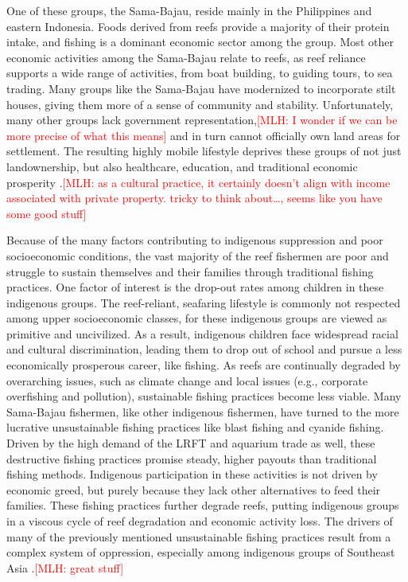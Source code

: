 \documentclass{book}\usepackage{knitr}
\newcommand{\red}[1]{\textcolor{red}{[MLH: #1]}}
\begin{document}
\begin{knitrout}
\begin{kframe}
{One of these groups, the Sama-Bajau, reside mainly in the Philippines and eastern Indonesia. Foods derived from reefs provide a majority of their protein intake, and fishing is a dominant economic sector among the group. Most other economic activities among the Sama-Bajau relate to reefs, as reef reliance supports a wide range of activities, from boat building, to guiding tours, to sea trading. Many groups like the Sama-Bajau have modernized to incorporate stilt houses, giving them more of a sense of community and stability. Unfortunately, many other groups lack government representation,\red{I wonder if we can be more precise of what this means} and in turn cannot officially own land areas for settlement. The resulting highly mobile lifestyle deprives these groups of not just landownership, but also healthcare, education, and traditional economic prosperity \citep{boatpeople}.\red{as a cultural practice, it certainly doesn't align with income associated with private property. tricky to think about\ldots, seems like you have some good stuff}

Because of the many factors contributing to indigenous suppression and poor socioeconomic conditions, the vast majority of the reef fishermen are poor and struggle to sustain themselves and their families through traditional fishing practices. One factor of interest is the drop-out rates among children in these indigenous groups. The reef-reliant, seafaring lifestyle is commonly not respected among upper socioeconomic classes, for these indigenous groups are viewed as primitive and uncivilized. As a result, indigenous children face widespread racial and cultural discrimination, leading them to drop out of school and pursue a less economically prosperous career, like fishing. As reefs are continually degraded by overarching issues, such as climate change and local issues (e.g., corporate overfishing and pollution), sustainable fishing practices become less viable. Many Sama-Bajau fishermen, like other indigenous fishermen, have turned to the more lucrative unsustainable fishing practices like blast fishing and cyanide fishing. Driven by the high demand of the LRFT and aquarium trade as well, these destructive fishing practices promise steady, higher payouts than traditional fishing methods. Indigenous participation in these activities is not driven by economic greed, but purely because they lack other alternatives to feed their families. These fishing practices further degrade reefs, putting indigenous groups in a viscous cycle of reef degradation and economic activity loss. The drivers of many of the previously mentioned unsustainable fishing practices result from a complex system of oppression, especially among indigenous groups of Southeast Asia \citep{boatpeople}.\red{great stuff}

}
\end{kframe}
\end{knitrout}
\end{document}
